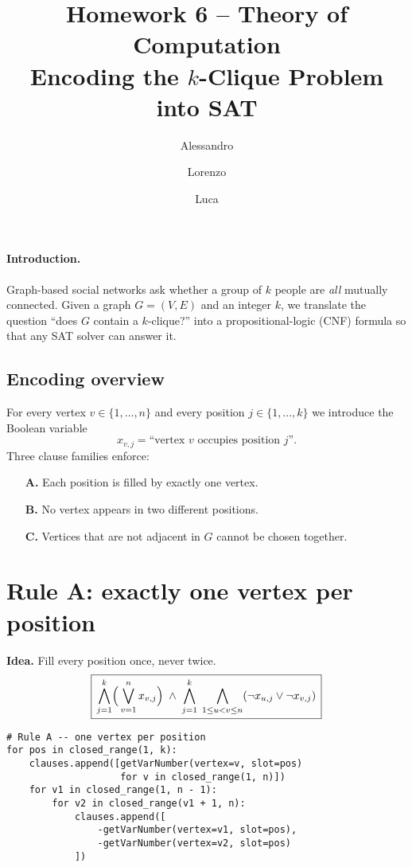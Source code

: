 \documentclass[11pt]{article}
\title{Homework 6 -- Theory of Computation\\[2mm]\large Encoding the $k$-Clique Problem into SAT}
\author{Alessandro \and Lorenzo \and Luca}
\date{}
\begin{document}
\maketitle

\paragraph*{Introduction.}
Graph-based social networks ask whether a group of $k$ people are \emph{all} mutually connected.  
Given a graph $G=(V,E)$ and an integer $k$, we translate the question  
``does $G$ contain a $k$-clique?'' into a propositional-logic (CNF) formula so that any SAT solver can answer it.

\subsection*{Encoding overview}
For every vertex $v\in\{1,\dots,n\}$ and every position $j\in\{1,\dots,k\}$ we introduce the Boolean variable
\[
x_{v,j}= \text{``vertex $v$ occupies position $j$''.}
\]
Three clause families enforce:

\begin{enumerate}
  \item[\textbf{A.}] Each position is filled by exactly one vertex.
  \item[\textbf{B.}] No vertex appears in two different positions.
  \item[\textbf{C.}] Vertices that are not adjacent in $G$ cannot be chosen together.
\end{enumerate}

\bigskip

\section*{Rule A: exactly one vertex per position}
\textbf{Idea.} Fill every position once, never twice.
\[
\boxed{\,
  \bigwedge_{j=1}^{k}\Bigl(\,\bigvee_{v=1}^{n}x_{v,j}\Bigr)\;
  \land\;
  \bigwedge_{j=1}^{k}\;\bigwedge_{1\le u<v\le n}
  (\lnot x_{u,j}\lor\lnot x_{v,j})\,}
\]

\begin{lstlisting}[style=py]
# Rule A -- one vertex per position
for pos in closed_range(1, k):
    clauses.append([getVarNumber(vertex=v, slot=pos)
                    for v in closed_range(1, n)])
    for v1 in closed_range(1, n - 1):
        for v2 in closed_range(v1 + 1, n):
            clauses.append([
                -getVarNumber(vertex=v1, slot=pos),
                -getVarNumber(vertex=v2, slot=pos)
            ])
\end{lstlisting}
\end{document}

